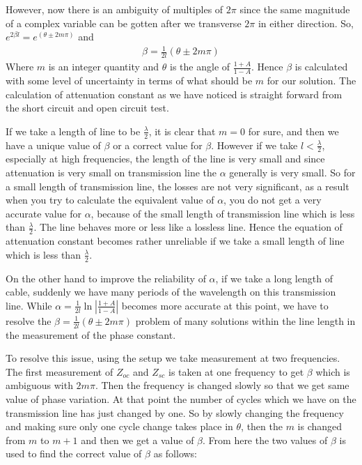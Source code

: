 However, now there is an ambiguity of multiples of $2\pi$ since the same magnitude of a complex variable can be gotten after we transverse $2\pi$ in either direction. So, $e^{2\beta l} = e^{(\theta \pm 2m\pi)}$ and
\begin{align}
\beta = \frac{1}{2l} (\theta \pm 2m\pi)
\end{align}
Where $m$ is an integer quantity and $\theta$ is the angle of $\frac{1 + A}{1 - A}$. Hence $\beta$ is calculated with some level of uncertainty in terms of what should be $m$ for our solution. The calculation of attenuation constant as we have noticed is straight forward from the short circuit and open circuit test.

If we take a length of line to be $\frac{\lambda}{2}$, it is clear that $m = 0$ for sure, and then we have a unique value of $\beta$ or a correct value for $\beta$. However if we take $l < \frac{\lambda}{2}$, especially at high frequencies, the length of the line is very small and since attenuation is very small on transmission line the $\alpha$ generally is very small. So for a small length of transmission line, the losses are not very significant, as a result when you try to calculate the equivalent value of $\alpha$, you do not get a very accurate value for $\alpha$, because of the small length of transmission line which is less than $\frac{\lambda}{2}$. The line behaves more or less like a lossless line. Hence the equation of attenuation constant becomes rather unreliable if we take a small length of line which is less than $\frac{\lambda}{2}$.

On the other hand to improve the reliability of $\alpha$, if we take a long length of cable, suddenly we have many periods of the wavelength on this transmission line. While $\alpha = \frac{1}{2l}\ln\left|\frac{1 + A}{1 - A}\right|$ becomes more accurate at this point, we have to resolve the $\beta = \frac{1}{2l} (\theta \pm 2m\pi)$ problem of many solutions within the line length in the measurement of the phase constant.

To resolve this issue, using the setup we take measurement at two frequencies. The first measurement of $Z_{oc}$ and $Z_{sc}$ is taken at one frequency  to get $\beta$ which is ambiguous with $2m\pi$. Then the frequency is changed slowly so that we get same value of phase variation. At  that point the number of cycles which we have on the transmission line has just changed by one. So by slowly changing the frequency and making sure only one cycle change takes place in $\theta$, then the $m$ is changed from $m$ to $m + 1$ and then we get a value of $\beta$. From here the two values of $\beta$ is used to find the correct value of $\beta$ as  follows:

